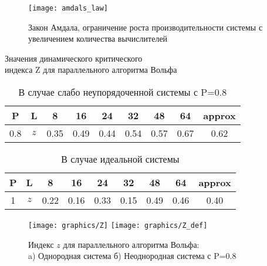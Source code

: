 \documentclass{beamer}
\begin{document}
\begin{frame}
\begin{figure}[h]
    \texttt{[image: amdals\_law]}
    \caption{Закон Амдала, ограничение роста производительности системы с
    увеличением количества вычислителей}
	\label{fig:3}
\end{figure}
\end{frame}

\begin{frame}{Значения динамического критического	\\
индекса Z для параллельного алгоритма Вольфа}
\begin{table}[h]
\caption{\centering В случае слабо неупорядоченной системы с P=0.8}
	\centering
	\begin{tabular}{|c|c|c|c|c|c|c|c|c|}
    	\hline 
        P & L & 8  & 16 & 24 & 32 & 48 & 64 & approx \\
        \hline
        0.8 & $z$ & 0.35 & 0.49 & 0.44 & 0.54 & 0.57 & 0.67 & 0.62 \\
        
        \hline
    \end{tabular}
\end{table}

\begin{table}[h]
\caption{\centering В случае идеальной системы}
	\centering
	\begin{tabular}{|c|c|c|c|c|c|c|c|c|}
    	\hline 
        P &L & 8  & 16 & 24 & 32 & 48 & 64 & approx  \\
        \hline
        1 & $z$ & 0.22 & 0.16 & 0.33 & 0.15 & 0.49 & 0.46 & 0.40  \\
        \hline
    \end{tabular}
\end{table}
\end{frame}

\begin{frame}
	\begin{figure}[h]
	\texttt{[image: graphics/Z]}
	\texttt{[image: graphics/Z\_def]}
		\caption{\centering Индекс $z$ для параллельного алгоритма Вольфа:\\ a)
							Однородная система б) Неоднородная система с P=0.8}
		\label{ris:td_chars}
	\end{figure}
\end{frame}
\end{document}
